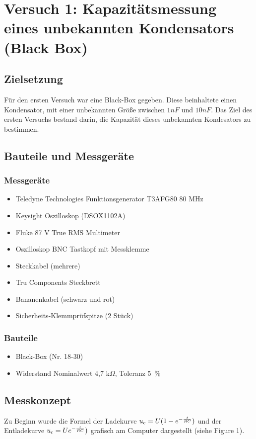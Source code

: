 \documentclass[a4paper,12pt]{article}
\begin{document}
\newpage

\section{Versuch 1: Kapazitätsmessung eines unbekannten Kondensators (Black Box)}

\subsection{Zielsetzung}
Für den ersten Versuch war eine Black-Box gegeben. Diese beinhaltete einen Kondensator, mit einer unbekannten Größe zwischen $1 nF$ und $10 nF$. Das Ziel des ersten Versuchs bestand darin, die Kapazität dieses unbekannten Kondesators zu bestimmen. 

\subsection{Bauteile und Messgeräte}
\subsubsection*{Messgeräte}
\begin{itemize}
\item Teledyne Technologies Funktionsgenerator T3AFG80 80 MHz
\item Keysight Oszilloskop (DSOX1102A)
\item Fluke 87 V True RMS Multimeter
\item Oszilloskop BNC Tastkopf mit Messklemme
\item Steckkabel (mehrere)
\item Tru Components Steckbrett
\item Bananenkabel (schwarz und rot)
\item Sicherheits-Klemmprüfspitze (2 Stück)
\end{itemize}

\subsubsection*{Bauteile}
\begin{itemize}
\item Black-Box (Nr. 18-30)
\item Widerstand Nominalwert 4,7 k$\Omega$, Toleranz 5~\%
\end{itemize}




\subsection{Messkonzept}
Zu Beginn wurde die Formel der Ladekurve \( u\textsubscript{c} = U (1 -e ^{-\frac{t}{RC}}) \) und der Entladekurve  \( u\textsubscript{c} = Ue ^{-\frac{t}{RC}}) \) grafisch am Computer dargestellt (siehe Figure 1). 
\end{document}
